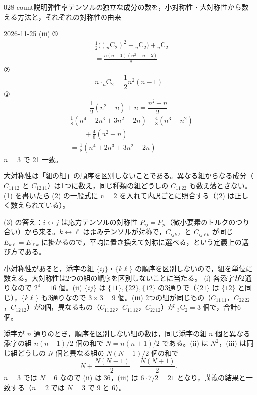 \documentclass[uplatex,dvipdfmx,a4paper,11pt]{jsarticle}
\begin{document}
\begin{mondai}{028-count}{説明}{弾性率テンソルの独立な成分の数を，小対称性・大対称性から数える方法と，それぞれの対称性の由来}
\begin{kotaeutsushi}{2026-11-25}
(iii)
①
\begin{align*}
&\frac{1}{2}\bigl(({}_{n}\mathrm{C}_{2})^{2}-{}_{n}\mathrm{C}_{2}\bigr)+{}_{n}\mathrm{C}_{2}\\
&=\frac{n(n-1)(n^{2}-n+2)}{8}
\end{align*}
② \[ n\cdot{}_{n}\mathrm{C}_{2}=\frac{1}{2}n^{2}(n-1) \]
③ \[ \frac{1}{2}(n^{2}-n)+n=\frac{n^{2}+n}{2} \]
\begin{align*}
&\frac{1}{8}(n^{4}-2n^{3}+3n^{2}-2n)+\frac{4}{8}(n^{3}-n^{2})\\
&\qquad+\frac{4}{8}(n^{2}+n)\\
&=\frac{1}{8}(n^{4}+2n^{3}+3n^{2}+2n)
\end{align*}
$n=3$ で 21 一致。
\mikai
\end{kotaeutsushi}
\begin{kizuki}
\item 大対称性は「組の組」の順序を区別しないことである。異なる組からなる成分（$C_{11\,12}$ と $C_{12\,11}$）は1つに数え，同じ種類の組どうしの $C_{11\,22}$ も数え落とさない。(1) を書いたら (2) の一般式に $n=2$ を入れて内訳ごとに照合する（(2) は正しく数えられている）。
\item (3) の答え：$i\leftrightarrow j$ は応力テンソルの対称性 $P_{ij}=P_{ji}$（微小要素のトルクのつり合い）から来る。$k\leftrightarrow\ell$ は歪みテンソルが対称で，$C_{ijk\ell}$ と $C_{ij\ell k}$ が同じ $E_{k\ell}=E_{\ell k}$ に掛かるので，平均に置き換えて対称に選べる，という定義上の選び方である。
\end{kizuki}
\begin{tadashii}
\houshin 小対称性があると，添字の組 $\{ij\}$・$\{k\ell\}$ の順序を区別しないので，組を単位に数える。大対称性は2つの組の順序を区別しないことに当たる。
\keisan {} (i) 各添字が2通りなので $2^{4}=16$ 個。(ii) $\{ij\}$ は $\{11\},\{22\},\{12\}$ の3通りで（$\{21\}$ は $\{12\}$ と同じ），$\{k\ell\}$ も3通りなので $3\times3=9$ 個。(iii) 2つの組が同じもの（$C_{11\,11}$，$C_{22\,22}$，$C_{12\,12}$）が3個，異なるもの（$C_{11\,22}$，$C_{11\,12}$，$C_{22\,12}$）が ${}_{3}\mathrm{C}_{2}=3$ 個で，合計6個。

 添字が $n$ 通りのとき，順序を区別しない組の数は，同じ添字の組 $n$ 個と異なる添字の組 $n(n-1)/2$ 個の和で $N=n(n+1)/2$ である。(ii) は $N^{2}$，(iii) は同じ組どうしの $N$ 個と異なる組の $N(N-1)/2$ 個の和で
\[ N+\frac{N(N-1)}{2}=\frac{N(N+1)}{2}. \]
$n=3$ では $N=6$ なので (ii) は $36$，(iii) は $6\cdot7/2=21$ となり，講義の結果と一致する（$n=2$ では $N=3$ で 9 と 6）。


\end{tadashii}
\end{mondai}
\end{document}
